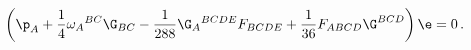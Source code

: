 \begin{equation} \label{gravitino}
\left(\p_A+{1\over 4}\omega_A{}^{BC}\G_{BC} -{1\over
288}\G_A{}^{BCDE}F_{BCDE}+{1\over 36} F_{ABCD}\G^{BCD}\right)\e=0 \,.
\end{equation}

